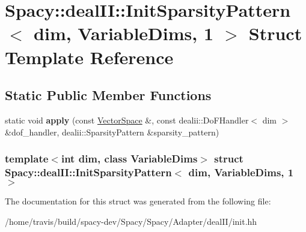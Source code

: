 \hypertarget{structSpacy_1_1dealII_1_1InitSparsityPattern_3_01dim_00_01VariableDims_00_011_01_4}{\section{\-Spacy\-:\-:deal\-I\-I\-:\-:\-Init\-Sparsity\-Pattern$<$ dim, \-Variable\-Dims, 1 $>$ \-Struct \-Template \-Reference}
\label{structSpacy_1_1dealII_1_1InitSparsityPattern_3_01dim_00_01VariableDims_00_011_01_4}
}
\subsection*{\-Static \-Public \-Member \-Functions}
\begin{DoxyCompactItemize}
\item 
\hypertarget{structSpacy_1_1dealII_1_1InitSparsityPattern_3_01dim_00_01VariableDims_00_011_01_4_a8c905d72f7a62318b6770bb2b60abd62}{static void {\bfseries apply} (const \hyperlink{classSpacy_1_1VectorSpace}{\-Vector\-Space} \&, const dealii\-::\-Do\-F\-Handler$<$ dim $>$ \&dof\-\_\-handler, dealii\-::\-Sparsity\-Pattern \&sparsity\-\_\-pattern)}\label{structSpacy_1_1dealII_1_1InitSparsityPattern_3_01dim_00_01VariableDims_00_011_01_4_a8c905d72f7a62318b6770bb2b60abd62}

\end{DoxyCompactItemize}
\subsubsection*{template$<$int dim, class Variable\-Dims$>$ struct Spacy\-::deal\-I\-I\-::\-Init\-Sparsity\-Pattern$<$ dim, Variable\-Dims, 1 $>$}



\-The documentation for this struct was generated from the following file\-:\begin{DoxyCompactItemize}
\item 
/home/travis/build/spacy-\/dev/\-Spacy/\-Spacy/\-Adapter/deal\-I\-I/init.\-hh\end{DoxyCompactItemize}
